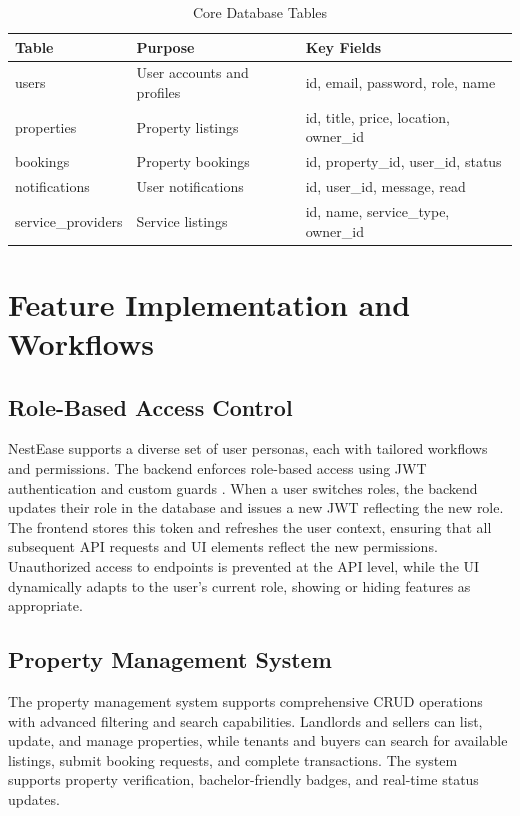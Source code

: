 \documentclass[conference]{IEEEtran}
\begin{document}
\begin{table}[ht]
\centering
\caption{Core Database Tables}
\begin{tabular}{|l|l|l|}
\hline
\textbf{Table} & \textbf{Purpose} & \textbf{Key Fields} \\
\hline
users & User accounts and profiles & id, email, password, role, name \\
\hline
properties & Property listings & id, title, price, location, owner\_id \\
\hline
bookings & Property bookings & id, property\_id, user\_id, status \\
\hline
notifications & User notifications & id, user\_id, message, read \\
\hline
service\_providers & Service listings & id, name, service\_type, owner\_id \\
\hline
\end{tabular}
\end{table}

\section{Feature Implementation and Workflows}
\subsection{Role-Based Access Control}
NestEase supports a diverse set of user personas, each with tailored workflows and permissions. The backend enforces role-based access using JWT authentication and custom guards \cite{role_based_access}. When a user switches roles, the backend updates their role in the database and issues a new JWT reflecting the new role. The frontend stores this token and refreshes the user context, ensuring that all subsequent API requests and UI elements reflect the new permissions. Unauthorized access to endpoints is prevented at the API level, while the UI dynamically adapts to the user's current role, showing or hiding features as appropriate.

\subsection{Property Management System}
The property management system supports comprehensive CRUD operations with advanced filtering and search capabilities. Landlords and sellers can list, update, and manage properties, while tenants and buyers can search for available listings, submit booking requests, and complete transactions. The system supports property verification, bachelor-friendly badges, and real-time status updates.
\end{document}

